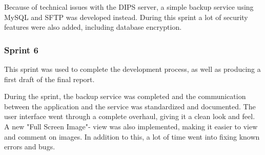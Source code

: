 Because of technical issues with the DIPS server, a simple backup service using MySQL and SFTP was developed instead. During this sprint a lot of security features were also added, including database encryption.    


\subsubsection{Sprint 6}
This sprint was used to complete the development process, as well as producing a first draft of the final report. 

During the sprint, the backup service was completed and the communication between the application and the service was standardized and documented. The user interface went through a complete overhaul, giving it a clean look and feel. A new "Full Screen Image"- view was also implemented, making it easier to view and comment on images. In addition to this, a lot of time went into fixing known errors and bugs.